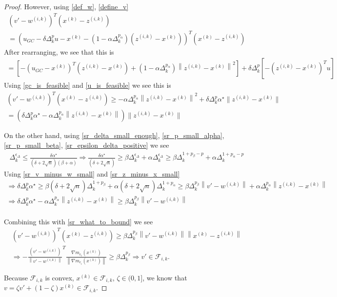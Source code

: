 \documentclass{article}
\theoremstyle{case}
\newcommand{\xk}{{x^{(k)}}}
\newcommand{\dk}{\Delta_k}
\newcommand{\zik}{{z^{(i, k)}}}
\newcommand{\fik}{{\mathcal F_{i, k}}}
\newcommand{\wik}{{w^{(i, k)}}}
\newcommand{\gmcik}{{\nabla m_{c_i}(\xk)}}
\newcommand{\minanglealpha}{{ \alpha^{\star} }}
\begin{document}
\begin{proof}
However, using \cref{def_w}, \cref{define_v}
\begin{align*}
\left(v' - \wik \right)^T\left(\xk - \zik \right) \\
=\left( u_{GC} - \delta\dk^{p}u - \xk - \left(1 - \alpha\dk^{p_{\alpha}}\right)\left(\zik - \xk\right) \right)^T\left(\xk - \zik \right)
\end{align*}
After rearranging, we see that this is
\begin{align*}
=\left[
-\left( u_{GC}- \xk\right)^T\left(\zik - \xk \right) 
+\left(1 - \alpha\dk^{p_{\alpha}}\right)\left\|\zik - \xk\right\|^2
\right]
+ \delta\dk^{p}\left[ -\left(\zik - \xk\right)^Tu\right]
\end{align*}
Using \cref{gc_is_feasible} and \cref{u_is_feasible} we see this is
\begin{align}
\left(v' - \wik \right)^T\left(\xk - \zik \right)  \ge - \alpha \dk ^{p_{\alpha}} \left\|\zik - \xk\right\|^2
+ \delta\dk^{p} \minanglealpha \|\zik - \xk\| \nonumber \\
= \left(
\delta\dk^{p} \minanglealpha
- \alpha \dk ^{p_{\alpha}} \left\|\zik - \xk\right\|
\right)\|\zik - \xk\| \label{sr_what_to_bound}
\end{align}

On the other hand, using \cref{sr_delta_small_enough}, \cref{sr_p_small_alpha}, \cref{sr_p_small_beta}, \cref{sr_epsilon_delta_positive} we see
\begin{align*}
\dk^{\epsilon_{\Delta}} \le \frac{\delta \minanglealpha}{\left(\delta + 2\sqrt{n}\right) \left(\beta +\alpha\right)} 
\Longrightarrow\frac{ \delta \minanglealpha }{\left(\delta + 2\sqrt{n}\right)} \ge \beta\dk^{\epsilon_{\Delta}} + \alpha\dk^{\epsilon_{\Delta}} 
\ge \beta \dk^{1 + p_{\beta} - p} + \alpha \dk ^{1 + p_{\alpha} - p}
\end{align*}
Using \cref{sr_v_minus_w_small} and \cref{sr_z_minus_x_small}
\begin{align*}
\Longrightarrow \delta\dk^{p} \minanglealpha  \ge \beta \left(\delta + 2\sqrt{n}\right) \dk^{1 + p_{\beta}} + \alpha\left(\delta + 2\sqrt{n}\right)  \dk ^{1 + p_{\alpha}}
\ge \beta \dk^{p_{\beta}}\left\|v' - \wik\right\| + \alpha \dk ^{p_{\alpha}} \left\|\zik - \xk\right\|\\
\Longrightarrow \delta\dk^{p} \minanglealpha - \alpha \dk ^{p_{\alpha}} \left\|\zik - \xk\right\|  \ge \beta \dk^{p_{\beta}}\left\|v' - \wik\right\| \\
\end{align*}

Combining this with \cref{sr_what_to_bound} we see
\begin{align*}
\left(v' - \wik \right)^T\left(\xk - \zik \right) \ge \beta \dk^{p_{\beta}}\left\|v' - \wik\right\| \left\|\xk - \zik\right\| \\
\Longrightarrow -\frac {\left(v' - \wik \right)}{\left\|v' - \wik \right\|}^T\frac{\gmcik}{\left\|\gmcik\right\|}\ge\beta \dk^{p_{\beta}} 
\Longrightarrow v' \in \fik.
\end{align*}

Because $\fik$ is convex, $\xk \in \fik$, $\zeta \in (0, 1]$, we know that $v = \zeta v' + (1 - \zeta)\xk\in\fik$.
\end{proof}
\end{document}
